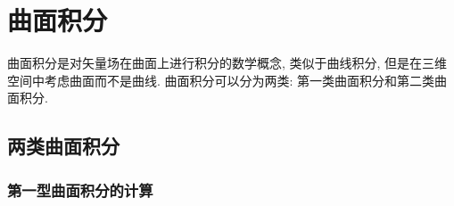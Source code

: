 \section{曲面积分}

曲面积分是对矢量场在曲面上进行积分的数学概念, 类似于曲线积分, 但是在三维空间中考虑曲面而不是曲线. 曲面积分可以分为两类: 第一类曲面积分和第二类曲面积分.

\subsection{两类曲面积分}

\subsubsection{第一型曲面积分的计算}

